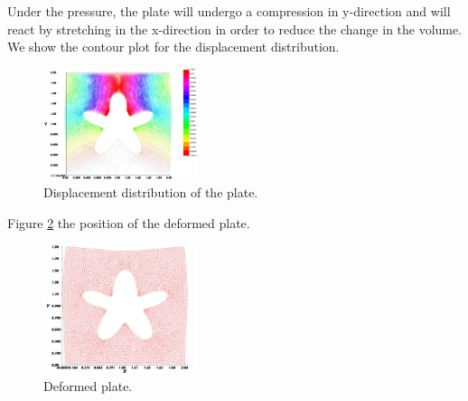 \documentclass[notitlepage,a4paper,fleqn,9pt]{icmfarticle}
\begin{document}
\begin{multicols}{2}
Under the pressure, the plate will undergo a compression in y-direction and will react by stretching in the x-direction in order to reduce the change in the volume.\\
We show the contour plot for the displacement distribution.

\begin{figure}[H]
  \begin{center}
    \includegraphics[width=0.4\textwidth]{4-3-4.pdf}
  \end{center}
  \caption{Displacement distribution of the plate.}
  \label{exam34}
\end{figure}

Figure \ref{exam35} the position of the deformed plate.

\begin{figure}[H]
  \begin{center}
    \includegraphics[width=0.4\textwidth]{4-3-5.pdf}
  \end{center}
  \caption{Deformed plate.}
  \label{exam35}
\end{figure}


\end{multicols}
\end{document}
